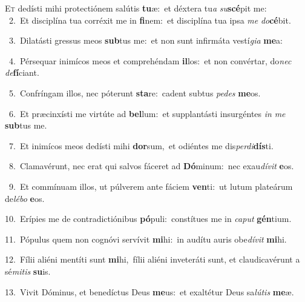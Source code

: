 \lettrine{\initial\textcolor{\initialcolor}{E}}{t} dedísti mihi protectiónem salútis \textbf{tu}\-æ:~\star et déxtera tu\textit{a} \textit{su}\-\textbf{scé}pit me:\\
{\numbfont\textcolor{\numbcolor}{~2.}}~Et disciplína tua corréxit me in \textbf{fi}\-nem:~\star et disciplína tua ipsa \textit{me} \textit{do}\-\textbf{cé}bit.\par
{\numbfont\textcolor{\numbcolor}{~3.}}~Dilatásti gressus meos \textbf{sub}\-tus me:~\star et non sunt infirmáta vestí\-\textit{gi}\-\textit{a} \textbf{me}\-a:\par
{\numbfont\textcolor{\numbcolor}{~4.}}~Pérsequar inimícos meos et comprehéndam \textbf{il}\-los:~\star et non convértar, do\textit{nec} \textit{de}\-\textbf{fí}ciant.\par
{\numbfont\textcolor{\numbcolor}{~5.}}~Confríngam illos, nec póterunt \textbf{sta}\-re:~\star cadent subtus \textit{pe}\-\textit{des} \textbf{me}\-os.\par
{\numbfont\textcolor{\numbcolor}{~6.}}~Et præcinxísti me virtúte ad \textbf{bel}\-lum:~\star et supplantásti insurgéntes \textit{in} \textit{me} \textbf{sub}\-tus me.\par
{\numbfont\textcolor{\numbcolor}{~7.}}~Et inimícos meos dedísti mihi \textbf{dor}\-sum,~\star et odiéntes me dis\-\textit{per}\-\textit{di}\textbf{dís}ti.\par
{\numbfont\textcolor{\numbcolor}{~8.}}~Clamavérunt, nec erat qui salvos fáceret ad \textbf{Dó}\-minum:~\star nec exau\-\textit{dí}\-\textit{vit} \textbf{e}\-os.\par
{\numbfont\textcolor{\numbcolor}{~9.}}~Et commínuam illos, ut púlverem ante fáciem \textbf{ven}\-ti:~\star ut lutum plateárum de\-\textit{lé}\-\textit{bo} \textbf{e}\-os.\par
{\numbfont\textcolor{\numbcolor}{10.}}~Erípies me de contradictiónibus \textbf{pó}\-puli:~\star constítues me in \textit{ca}\-\textit{put} \textbf{gén}\-tium.\par
{\numbfont\textcolor{\numbcolor}{11.}}~Pópulus quem non cognóvi servívit \textbf{mi}\-hi:~\star in audítu auris obe\-\textit{dí}\-\textit{vit} \textbf{mi}\-hi.\par
{\numbfont\textcolor{\numbcolor}{12.}}~Fílii aliéni mentíti sunt \textbf{mi}\-hi,~\star fílii aliéni inveteráti sunt, et claudicavérunt a sé\-\textit{mi}\-\textit{tis} \textbf{su}\-is.\par
{\numbfont\textcolor{\numbcolor}{13.}}~Vivit Dóminus, et benedíctus Deus \textbf{me}\-us:~\star et exaltétur Deus sa\-\textit{lú}\-\textit{tis} \textbf{me}\-æ.\par

